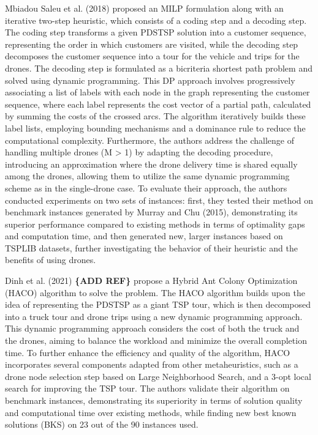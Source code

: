 \documentclass{article}
\begin{document}
	 \par
	 Mbiadou Saleu et al. (2018) proposed an MILP formulation along with an iterative two-step heuristic, which consists of a coding step and a decoding step. The coding step transforms a given PDSTSP solution into a customer sequence, representing the order in which customers are visited, while the decoding step decomposes the customer sequence into a tour for the vehicle and trips for the drones. The decoding step is formulated as a bicriteria shortest path problem and solved using dynamic programming. This DP approach involves progressively associating a list of labels with each node in the graph representing the customer sequence, where each label represents the cost vector of a partial path, calculated by summing the costs of the crossed arcs. The algorithm iteratively builds these label lists, employing bounding mechanisms and a dominance rule to reduce the computational complexity. Furthermore, the authors address the challenge of handling multiple drones (M > 1) by adapting the decoding procedure, introducing an approximation where the drone delivery time is shared equally among the drones, allowing them to utilize the same dynamic programming scheme as in the single-drone case. To evaluate their approach, the authors conducted experiments on two sets of instances: first, they tested their method on benchmark instances generated by Murray and Chu (2015), demonstrating its superior performance compared to existing methods in terms of optimality gaps and computation time, and then generated new, larger instances based on TSPLIB datasets, further investigating the behavior of their heuristic and the benefits of using drones.
	 \par 
	 Dinh et al. (2021) \textbf{\{ADD REF\}} propose a Hybrid Ant Colony Optimization (HACO) algorithm to solve the problem. The HACO algorithm builds upon the idea of representing the PDSTSP as a giant TSP tour, which is then decomposed into a truck tour and drone trips using a new dynamic programming approach. This dynamic programming approach considers the cost of both the truck and the drones, aiming to balance the workload and minimize the overall completion time. To further enhance the efficiency and quality of the algorithm, HACO incorporates several components adapted from other metaheuristics, such as a drone node selection step based on Large Neighborhood Search, and a 3-opt local search for improving the TSP tour. The authors validate their algorithm on benchmark instances, demonstrating its superiority in terms of solution quality and computational time over existing methods, while finding new best known solutions (BKS) on 23 out of the 90 instances used.
\end{document}
